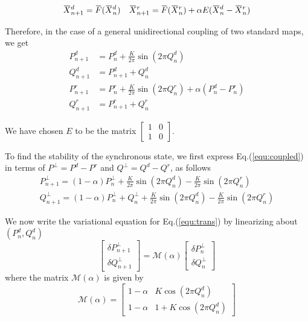 \documentclass[reprint,superscriptaddress,amsmath,amssymb,aps,pre]{revtex4-1}
\newcommand{\overbar}[1]{\mkern 1.5mu\overline{\mkern-1.5mu#1\mkern-1.5mu}\mkern 1.5mu}
\begin{document}
\begin{align}
\overbar{X}^d_{n+1} = \overbar{F}(\overbar{X}^d_{n}) \nonumber  &&
\overbar{X}^r_{n+1} = \overbar{F}(\overbar{X}^r_{n}) + \alpha E(\overbar{X}^d_{n}-\overbar{X}^r_n)
\end{align}

Therefore, in the case of a general unidirectional coupling of two standard maps, we get
\begin{align}
P^d_{n+1} &= P^d_n + \frac{K}{2\pi}\sin(2\pi Q^d_n) \nonumber\\
Q^d_{n+1} &= P^d_{n+1} + Q^d_n \nonumber\\
P^r_{n+1} &= P^r_n + \frac{K}{2\pi}\sin (2\pi Q^r_n) + \alpha(P^d_n-P^r_n) \nonumber \\
Q^r_{n+1} &= P^r_{n+1} + Q^r_n 
\label{equ:coupled}
\end{align}


We have chosen $E$ to be the matrix $\begin{bmatrix} 1 & 0 \\ 1 & 0 \end{bmatrix}$. 

To find the stability of the synchronous state, we first express  Eq.(\ref{equ:coupled}) in terms of  $P^\perp = P^d - P^r$ and $Q^\perp = Q^d - Q^r$, as follows
\begin{eqnarray}
\label{equ:trans}
P^\perp_{n+1} = (1-\alpha)P^\perp_n+ \frac{K}{2\pi} \sin(2\pi Q^d_n) - \frac{K}{2\pi} \sin(2\pi Q^r_n) \\ \nonumber
Q^\perp_{n+1} = (1-\alpha)P^\perp_n+ Q^\perp_n + \frac{K}{2\pi} \sin(2\pi Q^d_n) - \frac{K}{2\pi} \sin(2\pi Q^r_n)  
\end{eqnarray}

We now write the variational equation for Eq.(\ref{equ:trans}) by linearizing about $(P^d_n,Q^d_n)$
\begin{equation}
\label{equ:variational}
\left[ \begin{array}{c} \delta P^\perp_{n+1} \\ \delta Q^\perp_{n+1} \end{array} \right] = \mathcal{M}(\alpha)\left[ \begin{array}{c}\delta P^\perp_{n} \\ \delta Q^\perp_{n} \end{array} \right]
\end{equation}
where the matrix $\mathcal{M}(\alpha)$ is given by
\begin{equation} 
\label{equ:M}
\mathcal{M}(\alpha) = \begin{bmatrix} 1-\alpha & K\cos(2\pi Q^d_n) \\ 1 - \alpha & 1 + K\cos(2\pi Q^d_n) \end{bmatrix} 
\end{equation}
\end{document}

